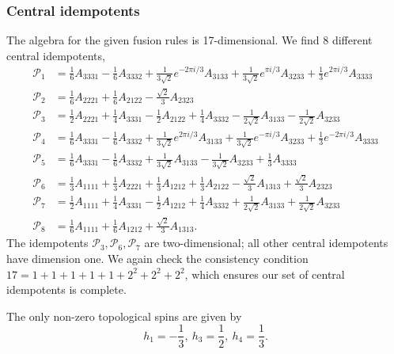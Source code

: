 \documentclass[12 pt]{article}
\begin{document}
\subsubsection{Central idempotents}
The algebra for the given fusion rules is 17-dimensional. We find 8 different central idempotents,
\begin{align*}
\mathcal{P}_1&=\frac{1}{6}A_{3331}-\frac{1}{6}A_{3332}+\frac{1}{3\sqrt{2}}e^{-2\pi i/3}A_{3133}+\frac{1}{3\sqrt{2}}e^{\pi i/3}A_{3233}+\frac{1}{3}e^{2 \pi i/3}A_{3333}\\
\mathcal{P}_2 &= \frac{1}{6}A_{2221}+\frac{1}{6}A_{2122}-\frac{\sqrt{2}}{3}A_{2323}\\
\mathcal{P}_3 &= \frac{1}{2}A_{2221}+\frac{1}{4}A_{3331}-\frac{1}{2}A_{2122}+\frac{1}{4}A_{3332}-\frac{1}{2\sqrt{2}}A_{3133}-\frac{1}{2\sqrt{2}}A_{3233}\\
\mathcal{P}_4 &= \frac{1}{6}A_{3331}-\frac{1}{6}A_{3332}+\frac{1}{3\sqrt{2}}e^{2 \pi i /3}A_{3133}+\frac{1}{3\sqrt{2}}e^{-\pi i/3}A_{3233}+\frac{1}{3}e^{-2 \pi i/3}A_{3333}\\
\mathcal{P}_5&= \frac{1}{6}A_{3331}-\frac{1}{6}A_{3332}+\frac{1}{3\sqrt{2}}A_{3133}-\frac{1}{3\sqrt{2}}A_{3233}+\frac{1}{3}A_{3333}\\
\mathcal{P}_6&=\frac{1}{3}A_{1111}+\frac{1}{3}A_{2221}+\frac{1}{3}A_{1212}+\frac{1}{3}A_{2122}-\frac{\sqrt{2}}{3}A_{1313}+\frac{\sqrt{2}}{3}A_{2323}\\
\mathcal{P}_7&=\frac{1}{2}A_{1111}+\frac{1}{4}A_{3331}-\frac{1}{2}A_{1212}+\frac{1}{4}A_{3332}+\frac{1}{2\sqrt{2}}A_{3133}+\frac{1}{2\sqrt{2}}A_{3233}\\
\mathcal{P}_8&=\frac{1}{6}A_{1111}+\frac{1}{6}A_{1212}+\frac{\sqrt{2}}{3}A_{1313}.
\end{align*}
The idempotents $\mathcal{P}_3,\mathcal{P}_6,\mathcal{P}_7$ are two-dimensional; all other central idempotents have dimension one. We again check the consistency condition $17 = 1+1+1+1+1+2^2+2^2+2^2$, which ensures our set of central idempotents is complete.
 
The only non-zero topological spins are given by
$$
h_1=-\frac{1}{3}, \: h_3=\frac{1}{2}, \: h_4=\frac{1}{3}.
$$
\end{document}
